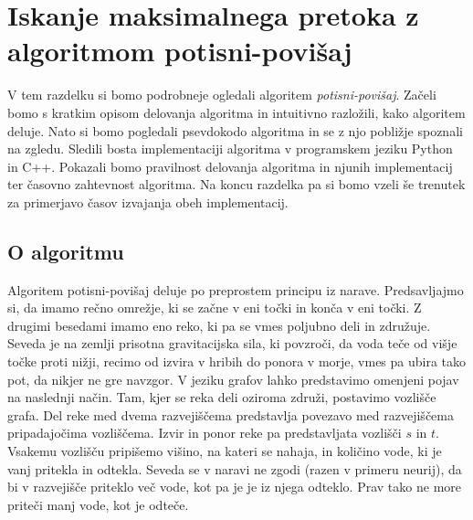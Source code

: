 \documentclass[mat1]{fmfdelo}
\begin{document}
\section{Iskanje maksimalnega pretoka z algoritmom potisni-povišaj}

V tem razdelku si bomo podrobneje ogledali algoritem \textit{potisni-povišaj}. Začeli bomo s kratkim opisom delovanja algoritma in intuitivno razložili, kako algoritem deluje. Nato si bomo pogledali psevdokodo algoritma in se z njo pobližje spoznali na zgledu. Sledili bosta implementaciji algoritma v programskem jeziku Python in C++. Pokazali bomo pravilnost delovanja algoritma in njunih implementacij ter časovno zahtevnost algoritma. Na koncu razdelka pa si bomo vzeli še trenutek za primerjavo časov izvajanja obeh implementacij.

\subsection{O algoritmu}
Algoritem potisni-povišaj deluje po preprostem principu iz narave. Predsavljajmo si, da imamo rečno omrežje, ki se začne v eni točki in konča v eni točki. Z drugimi besedami imamo eno reko, ki pa se vmes poljubno deli in združuje. Seveda je na zemlji prisotna gravitacijska sila, ki povzroči, da voda teče od višje točke proti nižji, recimo od izvira v hribih do ponora v morje, vmes pa ubira tako pot, da nikjer ne gre navzgor. V jeziku grafov lahko predstavimo omenjeni pojav na naslednji način. Tam, kjer se reka deli oziroma združi, postavimo vozlišče grafa. Del reke med dvema razvejiščema predstavlja povezavo med razvejiščema pripadajočima vozliščema. Izvir in ponor reke pa predstavljata vozlišči $s$ in $t$. Vsakemu vozlišču pripišemo višino, na kateri se nahaja, in količino vode, ki je vanj pritekla in odtekla. Seveda se v naravi ne zgodi (razen v primeru neurij), da bi v razvejišče priteklo več vode, kot pa je je iz njega odteklo. Prav tako ne more priteči manj vode, kot je odteče.
\end{document}
